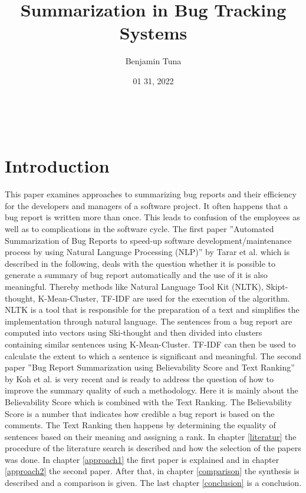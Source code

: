 \documentclass[a4paper,10pt, bibliography=totocnumbered]{scrreprt}
\author{Benjamin Tuna}
\title{Summarization in Bug Tracking Systems }
\subtitle{ }
\date{01 31, 2022}
\makeatletter
\renewcommand{\maketitle}{\begin{titlepage}
    \vskip 10\p@
    \hbox{
      \vrule depth 0.99\textheight
        \mbox{\hspace{2em}}
      \vtop{
        \vskip 10\p@
        \hspace{4pt}
        \vskip 50\p@
        \begin{flushleft}
          \Large \@author \par
        \end{flushleft}
        \vskip 50\p@
        \begin{flushleft}
          \huge \bfseries \@title \par
        \end{flushleft}
        \begin{flushleft}
          \Large \bfseries \@subtitle \par
        \end{flushleft}
        \vskip 70\p@
        \begin{flushleft}
          \Large \@publishers \par
        \end{flushleft}
        \vskip 50\p@
        \begin{flushleft}
          \Large \@date \par
        \end{flushleft}
        }}
  \end{titlepage}
}
\makeatother
\begin{document}
\maketitle



\tableofcontents

\chapter{Introduction}


This paper examines approaches to summarizing bug reports and their efficiency for the developers and managers of a software project. It often happens that a bug report is written more than once. This leads to confusion of the employees as well as to complications in the software cycle. The first paper ''Automated Summarization of Bug Reports to speed-up software development/maintenance process by using Natural Language Processing (NLP)'' by Tarar et al. \cite{tarar} which is described in the following, deals with the question whether it is possible to generate a summary of bug report automatically and the use of it is also meaningful. Thereby methods like Natural Language Tool Kit (NLTK), Skipt-thought, K-Mean-Cluster, TF-IDF are used for the execution of the algorithm. NLTK is a tool that is responsible for the preparation of a text and simplifies the implementation through natural language. The sentences from a bug report are computed into vectors using Ski-thought and then divided into clusters containing similar sentences using K-Mean-Cluster. TF-IDF can then be used to calculate the extent to which a sentence is significant and meaningful. The second paper ''Bug Report Summarization using Believability Score and Text Ranking'' by Koh et al. \cite{koh} is very recent and is ready to address the question of how to improve the summary quality of such a methodology. Here it is mainly about the Believability Score which is combined with the Text Ranking. The Believability Score is a number that indicates how credible a bug report is based on the comments. The Text Ranking then happens by determining the equality of sentences based on their meaning and assigning a rank. 
\linebreak
In chapter \ref{literatur} the procedure of the literature search is described and how the selection of the papers was done. In chapter \ref{approach1} the first paper is explained and in chapter \ref{approach2} the second paper. After that, in chapter \ref{comparison} the synthesis is described and a comparison is given. The last chapter \ref{conclusion} is a conclusion.
\end{document}
